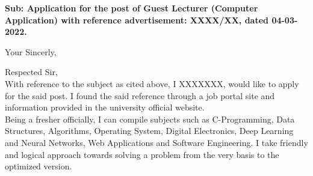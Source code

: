 \documentclass[11pt,a4paper,roman]{moderncv}
\begin{document}
\date{\today}
\opening{\textbf{Sub: Application for the post of Guest Lecturer (Computer Application) with reference advertisement: XXXX/XX, dated 04-03-2022.}}
\closing{Your Sincerly, \vspace{-1em}}


\makelettertitle



Respected Sir,
\\
\vspace{1em}
With reference to the subject as cited above, I XXXXXXX, would like to apply for the said post. I found the said reference through a job portal site and information provided in the university official website.\\

\vspace{1em}
Being a fresher officially, I can compile subjects such as C-Programming, Data Structures, Algorithms, Operating System, Digital Electronics, Deep Learning and Neural Networks, Web Applications and Software Engineering. I take friendly and logical approach towards solving a problem from the very basis to the optimized version.  \\
\vspace{1em}
\end{document}
